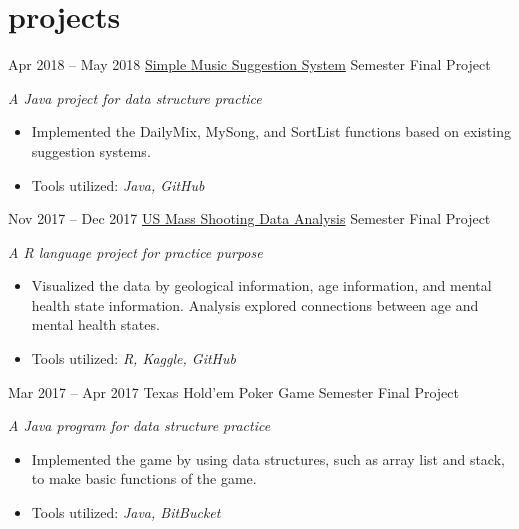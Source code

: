 \documentclass[]{friggeri-cv}
\begin{document}
\section{projects}
\begin{entrylist}
  \entry
    {Apr 2018 -- May 2018}
    {\href{https://github.com/TravisThomasAC/cs250-FinalProject-Team9}{Simple Music Suggestion System}}
    {Semester Final Project}
    {\emph{A Java project for data structure practice}
    \begin{itemize}[leftmargin=1.2em]
    \item Implemented the DailyMix, MySong, and SortList functions based on existing suggestion systems.
    \item Tools utilized: \emph{Java, GitHub}
    \end{itemize}}
  \entry
    {Nov 2017 -- Dec 2017}
    {\href{https://github.com/liux2/cs390f2017-project}{US Mass Shooting Data Analysis}}
    {Semester Final Project}
    {\emph{A R language project for practice purpose}
    \begin{itemize}[leftmargin=1.2em]
    \item Visualized the data by geological information, age information, and mental health state information. Analysis explored connections between age and mental health states.
    \item Tools utilized: \emph{R, Kaggle, GitHub}
    \end{itemize}}
  \entry
    {Mar 2017 -- Apr 2017}
    {Texas Hold’em Poker Game}
    {Semester Final Project}
    {\emph{A Java program for data structure practice}
    \begin{itemize}[leftmargin=1.2em]
    \item Implemented the game by using data structures, such as array list and stack, to make basic functions of the game.
    \item Tools utilized: \emph{Java, BitBucket}
    \end{itemize}}
\end{entrylist}
\end{document}
